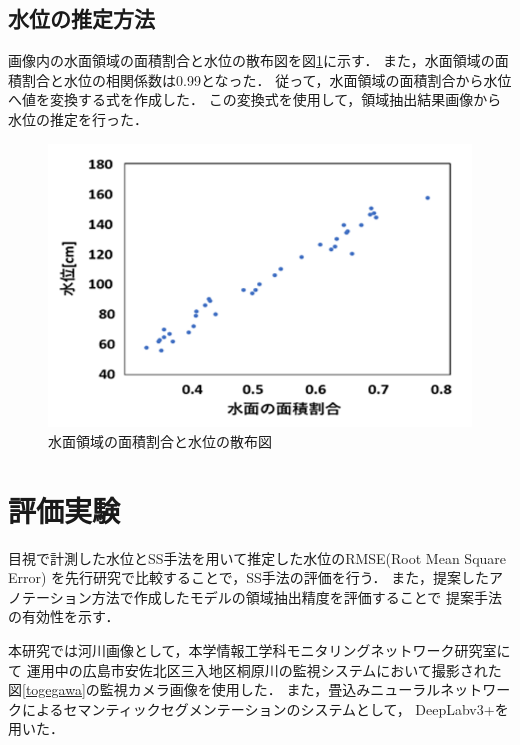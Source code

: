 \subsection{水位の推定方法}
\label{4.3}
画像内の水面領域の面積割合と水位の散布図を図\ref{soukan}に示す．
また，水面領域の面積割合と水位の相関係数は0.99となった．
従って，水面領域の面積割合から水位へ値を変換する式を作成した．
この変換式を使用して，領域抽出結果画像から水位の推定を行った．
\vspace{5mm}
\begin{figure}[h] 
  \begin{center}
    \includegraphics[width=0.8\linewidth]{image/soukan.png}
  \end{center}
  \caption{水面領域の面積割合と水位の散布図}
  \label{soukan}
\end{figure}
\clearpage
\section{評価実験}
目視で計測した水位とSS手法を用いて推定した水位のRMSE(Root Mean Square Error)
を先行研究\cite{watanabe}で比較することで，SS手法の評価を行う．
また，提案したアノテーション方法で作成したモデルの領域抽出精度を評価することで
提案手法の有効性を示す．

本研究では河川画像として，本学情報工学科モニタリングネットワーク研究室にて
運用中の広島市安佐北区三入地区桐原川の監視システムにおいて撮影された
図\ref{togegawa}の監視カメラ画像を使用した．
また，畳込みニューラルネットワークによるセマンティックセグメンテーションのシステムとして，
DeepLabv3+\cite{deeplabv3+}を用いた．

